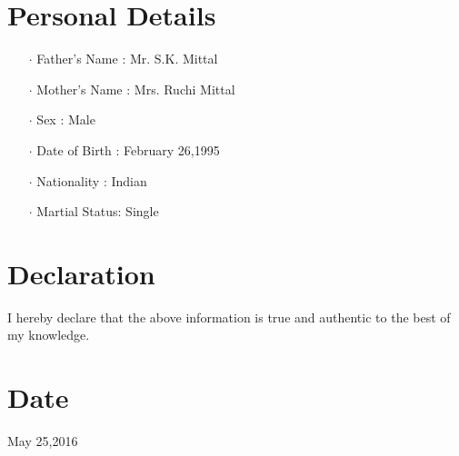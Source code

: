 \documentclass[12pt]{article}
\begin{document}
\section*{Personal Details}
\begin{itemize}
\item[$\cdot$]Father's Name : Mr. S.K. Mittal
\item[$\cdot$]Mother's Name : Mrs. Ruchi Mittal
\item[$\cdot$]Sex           : Male
\item[$\cdot$]Date of Birth : February 26,1995
\item[$\cdot$]Nationality   : Indian
\item[$\cdot$]Martial Status: Single
\end{itemize}
\section*{Declaration} I hereby declare that the above information is true and authentic to the best of my knowledge.
\section*{Date} May 25,2016
\end{document}
